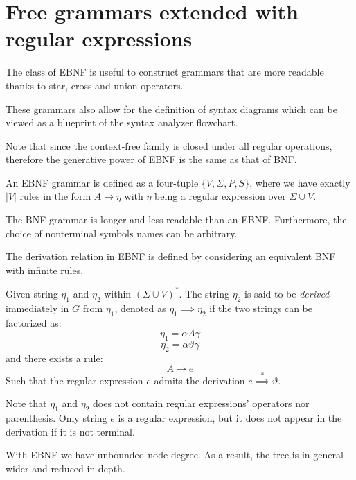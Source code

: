 \section{Free grammars extended with regular expressions}

The class of EBNF is useful to construct grammars that are more readable thanks to star, cross and union operators. 

These grammars also allow for the definition of syntax diagrams which can be viewed as a blueprint of the syntax analyzer flowchart. 

Note that since the context-free family is closed under all regular operations, therefore the generative power of EBNF is the same as that of BNF. 

\begin{definition}
    An EBNF grammar is defined as a four-tuple $\{V, \Sigma, P, S\}$, where we have exactly $\left\lvert V \right\rvert$ rules in the form $A \rightarrow \eta$ with $\eta$ being a regular expression over $\Sigma \cup V$.
\end{definition}
The BNF grammar is longer and less readable than an EBNF. 
Furthermore, the choice of nonterminal symbols names can be arbitrary. 

The derivation relation in EBNF is defined by considering an equivalent BNF with infinite rules. 
\begin{definition}
    Given string $\eta_1$ and $\eta_2$ within $(\Sigma \cup V)^{*}$. 
    The string $\eta_2$ is said to be \emph{derived} immediately in $G$ from $\eta_1$, denoted as $\eta_1 \implies \eta_2$ if the two strings can be factorized as: 
    \[\eta_1=\alpha A \gamma\]
    \[\eta_2=\alpha \vartheta \gamma\]
    and there exists a rule: 
    \[A \rightarrow e\]
    Such that the regular expression $e$ admits the derivation $e \overset{*}{\implies} \vartheta$. 
\end{definition}
Note that $\eta_1$ and $\eta_2$ does not contain regular expressions' operators nor parenthesis. 
Only string $e$ is a regular expression, but it does not appear in the derivation if it is not terminal.

With EBNF we have unbounded node degree. As a result, the tree is in general wider and reduced in depth. 